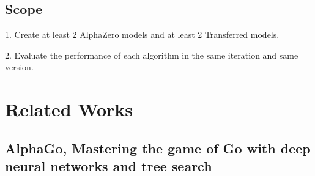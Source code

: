 \documentclass[12pt,a4paper]{article}
\begin{document}
\subsection{Scope}
{
\hspace{0.6cm} 1. Create at least 2 AlphaZero models and at least 2 Transferred models.\par
\hspace{0cm} 2. Evaluate the performance of each algorithm in the same iteration and same version.
}
\clearpage

\section{Related Works}
\subsection{AlphaGo, Mastering the game of Go with deep neural networks and tree search}
\end{document}
